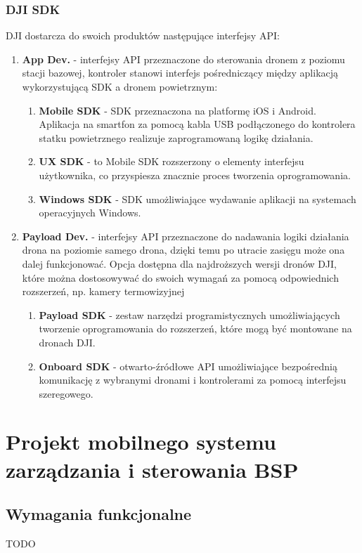 \subsubsection{DJI SDK}
DJI dostarcza do swoich produktów następujące interfejsy API:
\begin{enumerate}
  \item \textbf{App Dev.} - interfejsy API przeznaczone do sterowania dronem z poziomu stacji bazowej, kontroler stanowi interfejs pośredniczący między aplikacją wykorzystującą SDK a dronem powietrznym:\begin{enumerate}
    \item \textbf{Mobile SDK} - SDK przeznaczona na platformę iOS i Android. Aplikacja na smartfon za pomocą kabla USB podłączonego do kontrolera statku powietrznego realizuje zaprogramowaną logikę działania.
    \item \textbf{UX SDK} - to Mobile SDK rozszerzony o elementy interfejsu użytkownika, co przyspiesza znacznie proces tworzenia oprogramowania.
    \item \textbf{Windows SDK} - SDK umożliwiające wydawanie aplikacji na systemach operacyjnych Windows. 
  \end{enumerate}
  \item \textbf{Payload Dev.} - interfejsy API przeznaczone do nadawania logiki działania drona na poziomie samego drona, dzięki temu po utracie zasięgu może ona dalej funkcjonować. Opcja dostępna dla najdroższych wersji dronów DJI, które można dostosowywać do swoich wymagań za pomocą odpowiednich rozszerzeń, np. kamery termowizyjnej\begin{enumerate}
    \item \textbf{Payload SDK} - zestaw narzędzi programistycznych umożliwiających tworzenie oprogramowania do rozszerzeń, które mogą być montowane na dronach DJI. 
    \item \textbf{Onboard SDK} - otwarto-źródłowe API umożliwiające bezpośrednią komunikację z wybranymi dronami i kontrolerami za pomocą interfejsu szeregowego.
  \end{enumerate}
\end{enumerate}

\newpage
\section{Projekt mobilnego systemu zarządzania i sterowania BSP}
\subsection{Wymagania funkcjonalne}
TODO
